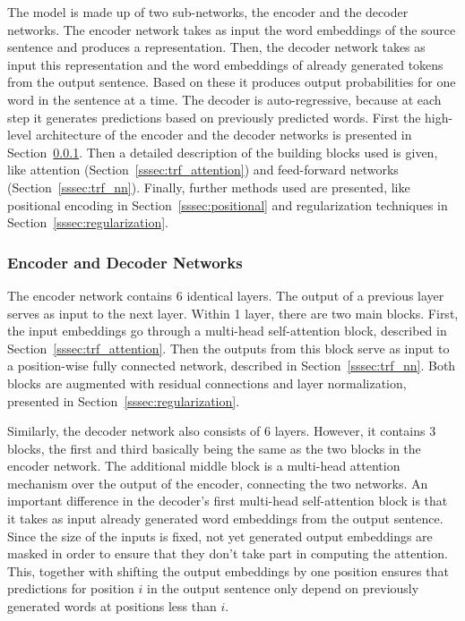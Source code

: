 \documentclass[12pt]{article}
\begin{document}
The model is made up of two sub-networks, the encoder and the decoder networks. The encoder network takes as input the word embeddings of the source sentence and produces a representation. Then, the decoder network takes as input this representation and the word embeddings of already generated tokens from the output sentence. Based on these it produces output probabilities for one word in the sentence at a time. The decoder is auto-regressive, because at each step it generates predictions based on previously predicted words. First the high-level architecture of the encoder and the decoder networks is presented in Section~\ref{sssec:encdec}. Then a detailed description of the building blocks used is given, like attention (Section~\ref{sssec:trf_attention}) and feed-forward networks (Section~\ref{sssec:trf_nn}). Finally, further methods used are presented, like positional encoding in Section~\ref{sssec:positional} and regularization techniques in Section~\ref{sssec:regularization}.

\subsubsection{Encoder and Decoder Networks} \label{sssec:encdec}
The encoder network contains 6 identical layers. The output of a previous layer serves as input to the next layer. Within 1 layer, there are two main blocks. First, the input embeddings go through a multi-head self-attention block, described in Section~\ref{sssec:trf_attention}. Then the outputs from this block serve as input to a position-wise fully connected network, described in Section~\ref{sssec:trf_nn}. Both blocks are augmented with residual connections and layer normalization, presented in Section~\ref{sssec:regularization}.

Similarly, the decoder network also consists of 6 layers. However, it contains 3 blocks, the first and third basically being the same as the two blocks in the encoder network. The additional middle block is a multi-head attention mechanism over the output of the encoder, connecting the two networks. An important difference in the decoder's first multi-head self-attention block is that it takes as input already generated word embeddings from the output sentence. Since the size of the inputs is fixed, not yet generated output embeddings are masked in order to ensure that they don't take part in computing the attention. This, together with shifting the output embeddings by one position ensures that predictions for position \(i\) in the output sentence only depend on previously generated words at positions less than \(i\).
\end{document}
